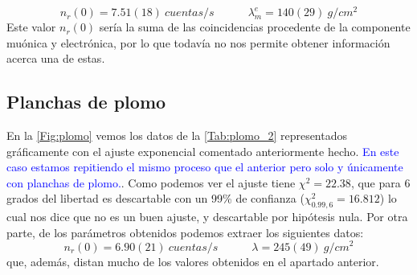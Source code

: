 \documentclass[11pt]{article}
\newcommand{\tquad}{\quad \quad \quad}
\begin{document}
\begin{equation}
	n_r(0) = 7.51(18) \ \unit{cuentas/s}  \tquad \lambda_m^e = 140(29) \ \unit{g/cm^2}
\end{equation}
Este valor $n_r(0)$ sería la suma de las coincidencias procedente de la componente muónica y electrónica, por lo que todavía no nos permite obtener información acerca una de estas.


\subsection{Planchas de plomo}

En la \cref{Fig:plomo} vemos los datos de la \cref{Tab:plomo_2} representados gráficamente con el ajuste exponencial comentado anteriormente hecho. \textcolor{blue}{En este caso estamos repitiendo el mismo proceso que el anterior pero solo y únicamente con planchas de plomo.}. Como podemos ver el ajuste tiene $\chi^2=22.38$, que  para 6 grados del libertad es descartable con un 99\% de confianza ($\chi^2_{0.99,6}=16.812$) lo cual nos dice que no es un buen ajuste, y descartable por hipótesis nula. Por otra parte, de los parámetros obtenidos podemos extraer los siguientes datos: 
\begin{equation}
	n_r(0) = 6.90(21) \ \unit{cuentas/s}  \tquad \lambda = 245(49) \ \unit{g/cm^2}
\end{equation}
que, además, distan mucho de los valores obtenidos en el apartado anterior.
\end{document}
